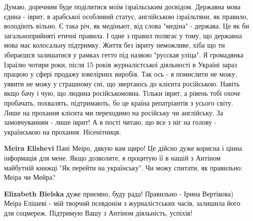 \begin{itemize}
 

Думаю, доречним буде поділитися моїм ізраїльським досвідом. Державна мова єдина
- іврит, в арабської особливий статус, англійською ізраїльтяни, як правило,
володіють вільно. Є така річ, як медіньют, від слова "медіна" - держава. Це як
би загальноприйняті етичні правила. І одне з правил полягає у тому, що державна
мова має колосальну підтримку. Життя без івриту неможливе, хіба що ти збираєшся
залишатися у рамках гетто під назвою "русская уліца". Я громадянка Ізраїлю
чотири роки, після 15 років журналістської діяльності в Україні зараз працюю у
сфері продажу ювелірних виробів. Так ось - я помислити не можу, уявити не можу
у страшному сні, що звертаюсь до клієнта російською. Навіть якщо бачу і чую, що
людина російськомовна. Тільки іврит, а рівень тобі охоче пробачать, похвалять,
підтримають, бо це країна репатріантів з усього світу. Лише на прохання клієнта
ми переходимо на російську чи англійську. За замовчуванням - лише іврит! А в
пості читаю, що все з ніг на голову - українською на прохання. Нісенітниця.

\begin{itemize}
 
\textbf{Meira Elishevi} Пані Меіро, дякую вам щиро! Це дійсно дуже корисна і цінна інформація для мене. Якщо дозволите, я процитую її в нашій з Антіном майбутній книжці "Як перейти на українську". Чи можу спитати, як правильно: Меіра чи Мейра?

 
\textbf{Elizabeth Bielska} дуже приємно, буду рада! Правильно - Ірина Вертікова) Меіра Елішеві - мій творчий псевдонім з журналістських часів, залишила його для соцмереж. Підтримую Вашу з Антіном діяльність, успіхів!
\end{itemize}


\end{itemize}
